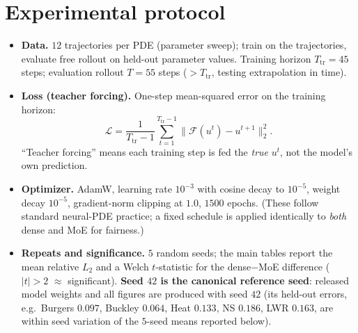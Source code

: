 \documentclass[11pt]{article}
\begin{document}
\section{Experimental protocol}\label{sec:protocol}
\begin{itemize}[leftmargin=*,itemsep=2pt]
\item \textbf{Data.} $12$ trajectories per PDE (parameter sweep); train on the trajectories, evaluate
      free rollout on held-out parameter values. Training horizon $T_{\mathrm{tr}}{=}45$ steps;
      evaluation rollout $T{=}55$ steps ($>T_{\mathrm{tr}}$, testing extrapolation in time).
\item \textbf{Loss (teacher forcing).} One-step mean-squared error on the training horizon:
      \begin{equation}
      \mathcal{L} = \frac{1}{T_{\mathrm{tr}}-1}\sum_{t=1}^{T_{\mathrm{tr}}-1}
      \big\|\mathcal{F}(u^t)-u^{t+1}\big\|_2^2 .
      \end{equation}
      ``Teacher forcing'' means each training step is fed the \emph{true} $u^t$, not the model's own
      prediction.
\item \textbf{Optimizer.} AdamW, learning rate $10^{-3}$ with cosine decay to $10^{-5}$, weight decay
      $10^{-5}$, gradient-norm clipping at $1.0$, $1500$ epochs. (These follow standard neural-PDE
      practice; a fixed schedule is applied identically to \emph{both} dense and MoE for fairness.)
\item \textbf{Repeats and significance.} $5$ random seeds; the main tables report the mean relative
      $L_2$ and a Welch $t$-statistic for the dense$-$MoE difference ($|t|>2$ $\approx$ significant).
      \textbf{Seed $42$ is the canonical reference seed}: released model weights and all figures are
      produced with seed $42$ (its held-out errors, e.g.\ Burgers $0.097$, Buckley $0.064$, Heat
      $0.133$, NS $0.186$, LWR $0.163$, are within seed variation of the $5$-seed means reported
      below).
\end{itemize}

\end{document}
